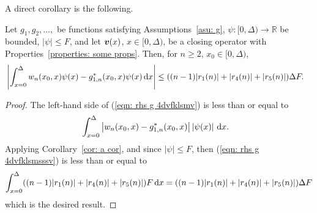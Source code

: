 A direct corollary is the following.
\begin{cor}\label{cor: asjdajaaaaa}
	 Let \(g_1,g_2,\dots,\) be functions satisfying Assumptions~\ref{asu: g}, \(\psi:[0,\Delta) \to \mathbb R\) be bounded, \(|\psi|\leq F\), and let \({\boldsymbol v}(x)\), \(x\in[0,\Delta)\), be a closing operator with Properties~\ref{properties: some props}. Then, for \(n\geq 2\), \(x_0\in[0,\Delta)\), 
	\begin{align}
		&\left| \int_{x=0}^\Delta w_n(x_0,x) \psi(x)-g_{1,n}^*(x_0,x)\psi(x)\, \mathrm{d} x\right|  
		\leq ((n-1)|r_1(n)| + |r_4(n)| + |r_5(n)|)\Delta F. \label{eqn: rhs g 4dvfklsmv}
	\end{align}
\end{cor}
\begin{proof}
	The left-hand side of (\ref{eqn: rhs g 4dvfklsmv}) is less than or equal to 
	\begin{align}
		&\int_{x=0}^\Delta \left| w_n(x_0,x) 
		{}- g_{1,n}^*(x_0,x)\right| \left|\psi(x)\right| \, \mathrm{d} x. \label{eqn: rhs g 4dvfklsmsssv}
	\end{align}
	Applying Corollary~\ref{cor: a cor}, and since \(|\psi|\leq F\), then (\ref{eqn: rhs g 4dvfklsmsssv}) is less than or equal to 
	\begin{align}
		\int_{x=0}^\Delta((n-1)|r_1(n)| + |r_4(n)| + |r_5(n)|) F \, \mathrm{d} x \nonumber 
		= ((n-1)|r_1(n)| + |r_4(n)| + |r_5(n)|)\Delta F \nonumber
	\end{align}
	which is the desired result.
\end{proof}

